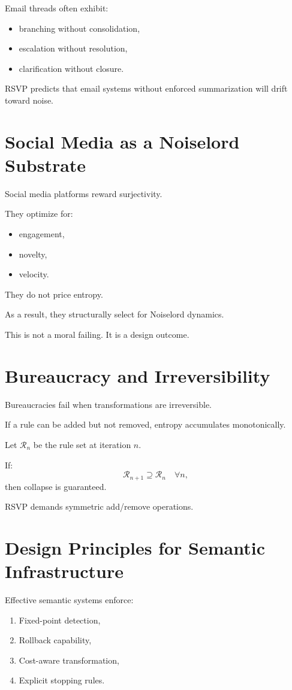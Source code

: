 \documentclass[11pt]{book}
\begin{document}
Email threads often exhibit:
\begin{itemize}
\item branching without consolidation,
\item escalation without resolution,
\item clarification without closure.
\end{itemize}

RSVP predicts that email systems without enforced summarization will drift
toward noise.

\section{Social Media as a Noiselord Substrate}

Social media platforms reward surjectivity.

They optimize for:
\begin{itemize}
\item engagement,
\item novelty,
\item velocity.
\end{itemize}

They do not price entropy.

As a result, they structurally select for Noiselord dynamics.

This is not a moral failing.
It is a design outcome.

\section{Bureaucracy and Irreversibility}

Bureaucracies fail when transformations are irreversible.

If a rule can be added but not removed, entropy accumulates monotonically.

Let \(\mathcal{R}_n\) be the rule set at iteration \(n\).

If:
\[
\mathcal{R}_{n+1} \supseteq \mathcal{R}_n
\quad \forall n,
\]
then collapse is guaranteed.

RSVP demands symmetric add/remove operations.

\section{Design Principles for Semantic Infrastructure}

Effective semantic systems enforce:

\begin{enumerate}
\item Fixed-point detection,
\item Rollback capability,
\item Cost-aware transformation,
\item Explicit stopping rules.
\end{enumerate}
\end{document}
